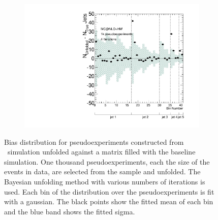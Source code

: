 \begin{figure}
\begin{subfigure}[]{0.5\textwidth}
\end{subfigure}
\begin{subfigure}[]{0.5\textwidth}
\includegraphics[width=\textwidth]{fig/Stress/105200atlfast/Bias4Iterations.pdf}
\end{subfigure}
\caption{Bias distribution for pseudoexperiments constructed from \newline \mcnlohw\ simulation unfolded against a matrix filled with the baseline simulation. One thousand pseudoexperiments, each the size of the events in data, are selected from the sample and unfolded. The Bayesian unfolding method with various numbers of iterations is used. Each bin of the distribution over the pseudoexperiments is fit with a gaussian. The black points show the fitted mean of each bin and the blue band shows the fitted sigma. }
\label{fig:mcnlohwbias}
\end{figure}
\clearpage
